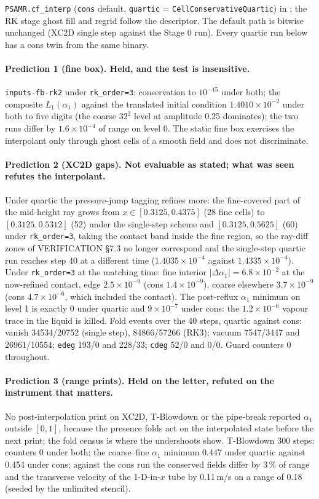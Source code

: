 \documentclass[11pt,a4paper]{article}
\newcommand{\code}[1]{\texttt{\small #1}}
\begin{document}
\code{PSAMR.cf\_interp} (\code{cons} default, \code{quartic} =
\code{CellConservativeQuartic}) in ; the RK stage
ghost fill and regrid follow the descriptor.  The default path is bitwise
unchanged (XC2D single step against the Stage 0 run).  Every quartic run
below has a cons twin from the same binary.

\paragraph{Prediction 1 (fine box).  Held, and the test is insensitive.}
\code{inputs-fb-rk2} under \code{rk\_order=3}: conservation to
$10^{-15}$ under both; the composite $L_1(\alpha_1)$ against the
translated initial condition $1.4010\times10^{-2}$ under both to five
digits (the coarse $32^2$ level at amplitude 0.25 dominates); the two
runs differ by $1.6\times10^{-4}$ of range on level 0.  The static fine
box exercises the interpolant only through ghost cells of a smooth field
and does not discriminate.

\paragraph{Prediction 2 (XC2D gaps).  Not evaluable as stated; what was
seen refutes the interpolant.}
Under quartic the pressure-jump tagging refines more: the fine-covered
part of the mid-height ray grows from $x\in[0.3125,0.4375]$ (28 fine
cells) to $[0.3125,0.5312]$ (52) under the single-step scheme and
$[0.3125,0.5625]$ (60) under \code{rk\_order=3}, taking the contact band
inside the fine region, so the ray-diff zones of VERIFICATION \S7.3 no
longer correspond and the single-step quartic run reaches step 40 at a
different time ($1.4035\times10^{-4}$ against $1.4335\times10^{-4}$).
Under \code{rk\_order=3} at the matching time: fine interior
$|\Delta\alpha_1| = 6.8\times10^{-2}$ at the now-refined contact, edge
$2.5\times10^{-9}$ (cons $1.4\times10^{-9}$), coarse elsewhere
$3.7\times10^{-9}$ (cons $4.7\times10^{-6}$, which included the contact).
The post-reflux $\alpha_1$ minimum on level 1 is exactly 0 under quartic
and $9\times10^{-7}$ under cons: the $1.2\times10^{-6}$ vapour trace in
the liquid is killed.  Fold events over the 40 steps, quartic against
cons: vanish 34534/20752 (single step), 84866/57266 (RK3); vacuum
7547/3447 and 26961/10554; \code{edeg} 193/0 and 228/33; \code{cdeg} 52/0
and 0/0.  Guard counters 0 throughout.

\paragraph{Prediction 3 (range prints).  Held on the letter, refuted on
the instrument that matters.}
No post-interpolation print on XC2D, T-Blowdown or the pipe-break
reported $\alpha_1$ outside $[0,1]$, because the presence folds act on
the interpolated state before the next print; the fold census is where
the undershoots show.  T-Blowdown 300 steps: counters 0 under both; the
coarse--fine $\alpha_1$ minimum 0.447 under quartic against 0.454 under
cons; against the cons run the conserved fields differ by 3\,\% of range
and the transverse velocity of the 1-D-in-$x$ tube by 0.11\,m/s on a
range of 0.18 (seeded by the unlimited stencil).
\end{document}
